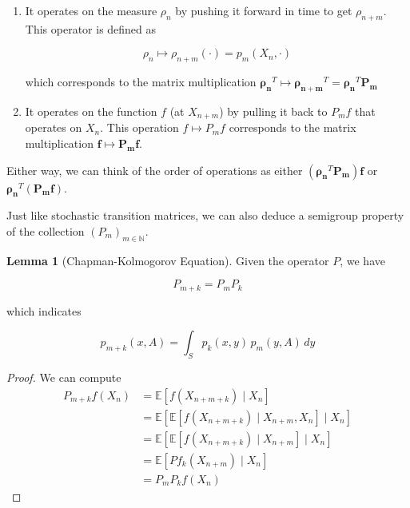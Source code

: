 \documentclass{article}
\theoremstyle{definition}
\newtheorem{lemma}[theorem]{Lemma}
\theoremstyle{remark}
\theoremstyle{definition}
\begin{document}
  \begin{enumerate}
    \item It operates on the measure $\rho_n$ by pushing it forward in time to get $\rho_{n + m}$. This operator is defined as 

      \[\rho_n \mapsto \rho_{n + m}(\cdot) = p_m (X_n, \cdot)\]

    which corresponds to the matrix multiplication $\boldsymbol{\rho_n}^T \mapsto \boldsymbol{\rho_{n + m}}^T = \boldsymbol{\rho_{n}}^T \mathbf{P_m}$

    \item It operates on the function $f$ (at $X_{n + m}$) by pulling it back to $P_m f$ that operates on $X_n$. This operation $f \mapsto P_m f$ corresponds to the matrix multiplication $\mathbf{f} \mapsto \mathbf{P_m} \mathbf{f}$. 
  \end{enumerate}
  Either way, we can think of the order of operations as either $(\boldsymbol{\rho_n}^T \mathbf{P_m}) \mathbf{f}$ or $\boldsymbol{\rho_n}^T (\mathbf{P_m} \mathbf{f})$. 

  Just like stochastic transition matrices, we can also deduce a semigroup property of the collection $(P_m)_{m \in \mathbb{N}}$. 

  \begin{lemma}[Chapman-Kolmogorov Equation]
    Given the operator $P$, we have 

      \[P_{m + k} = P_m P_k\]

    which indicates 

      \[p_{m + k} (x, A) = \int_S p_k (x, y) \, p_m (y, A) \,dy\]
  \end{lemma}
  \begin{proof}
    We can compute 
    \begin{align*}
      P_{m + k} f (X_n) & = \mathbb{E}[ f (X_{n + m + k}) \mid X_{n}] \\
      & = \mathbb{E}[ \mathbb{E}[ f(X_{n + m + k}) \mid X_{n + m}, X_n] \mid X_n] \\
      & = \mathbb{E}[ \mathbb{E}[ f(X_{n + m + k}) \mid X_{n + m}] \mid X_n] \\ 
      & = \mathbb{E}[ P f_k (X_{n + m}) \mid X_n] \\ 
      & = P_m P_k f (X_n)
    \end{align*}
  \end{proof}
\end{document}
